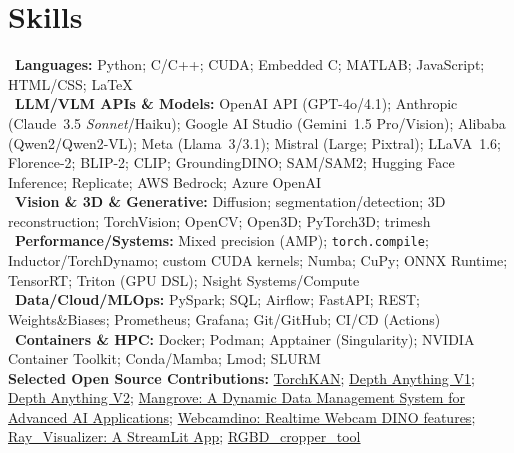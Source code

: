 \section*{Skills}

\textbullet~\textbf{Languages:} Python; C/C++; CUDA; Embedded C; MATLAB; JavaScript; HTML/CSS; \LaTeX\\
\textbullet~\textbf{LLM/VLM APIs \& Models:} OpenAI API (GPT\mbox{-}4o/4.1); Anthropic (Claude~3.5 \emph{Sonnet}/Haiku); Google AI Studio (Gemini~1.5 Pro/Vision); Alibaba (Qwen2/Qwen2\mbox{-}VL); Meta (Llama~3/3.1); Mistral (Large; Pixtral); LLaVA~1.6; Florence\mbox{-}2; BLIP\mbox{-}2; CLIP; GroundingDINO; SAM/SAM2; Hugging Face Inference; Replicate; AWS Bedrock; Azure OpenAI\\
\textbullet~\textbf{Vision \& 3D \& Generative:} Diffusion; segmentation/detection; 3D reconstruction; TorchVision; OpenCV; Open3D; PyTorch3D; trimesh\\
\textbullet~\textbf{Performance/Systems:} Mixed precision (AMP); \texttt{torch.compile}; Inductor/TorchDynamo; custom CUDA kernels; Numba; CuPy; ONNX Runtime; TensorRT; Triton (GPU DSL); Nsight Systems/Compute\\
\textbullet~\textbf{Data/Cloud/MLOps:} PySpark; SQL; Airflow; FastAPI; REST; Weights\&Biases; Prometheus; Grafana; Git/GitHub; CI/CD (Actions)\\
\textbullet~\textbf{Containers \& HPC:} Docker; Podman; Apptainer (Singularity); NVIDIA Container Toolkit; Conda/Mamba; Lmod; SLURM\\

\textbf{Selected Open Source Contributions:} 
\href{https://github.com/1ssb/torchkan}{TorchKAN};
\href{https://github.com/LiheYoung/Depth-Anything}{Depth Anything V1};
\href{https://github.com/DepthAnything/Depth-Anything-V2}{Depth Anything V2};
\href{https://github.com/1ssb/mangroves}{Mangrove: A Dynamic Data Management System for Advanced AI Applications};
\href{https://github.com/1ssb/webcamdino}{Webcamdino: Realtime Webcam DINO features};
\href{https://github.com/1ssb/ray_visualizer}{Ray\_Visualizer: A StreamLit App};
\href{https://github.com/1ssb/RGBD_cropper_tool}{RGBD\_cropper\_tool}
